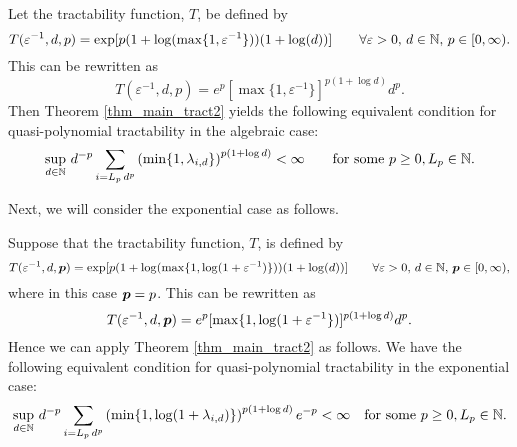 \documentclass[sort&compress]{elsarticle}
\newcommand{\peter}[1]{\begingroup\color{purple}#1\endgroup}
\begin{document}
\begin{example} 


Let the tractability function, $T$,
be defined by
\[
 T(\varepsilon^{-1},d,p)= \exp[ p(1+\log(\max\{1,\varepsilon^{-1}\}))(1+\log (d))]  \qquad \forall \varepsilon > 0, \,  d \in \mathbb{N}, \, p \in [0,\infty).
\]
This can be rewritten as 
\[
T(\varepsilon^{-1},d,p) = e^p[\max\{1,\varepsilon^{-1}\}]^{p(1+\log d)}d^p.
\]
Then Theorem \ref{thm_main_tract2} yields the following equivalent condition for quasi-polynomial tractability in the algebraic case:
\[
\sup_{d\in\mathbb{N}}\,d^{-p}\sum_{i=L_p\,d^{p}} \left(\min\{1,\lambda_{i,d}\} \right)^{p(1+\log d)} < \infty \qquad \text{for some } p \geq 0, L_p \in \mathbb{N}.\]
\end{example}
Next, we will consider the exponential case as follows.
\begin{example}

\noindent Suppose that the tractability function, $T$, is defined by
\[
 T(\varepsilon^{-1},d,\boldsymbol{p})= \exp [p(1+\log(\max\{1,\log(1+\varepsilon^{-1})\}))(1+\log (d))]  \qquad \forall \varepsilon > 0, \,  d \in \mathbb{N}, \, \boldsymbol{p} \in [0,\infty),
\] where in this case $\boldsymbol{p} = p$. This can be rewritten as 
\[
T(\varepsilon^{-1},d,\boldsymbol{p}) = e^p[\max\{1,\log(1+\varepsilon^{-1}\})]^{p(1+\log d)}d^p.
\]
Hence we can apply Theorem \ref{thm_main_tract2} as follows. We have the following equivalent condition for quasi-polynomial tractability in the exponential case:
\[
\sup_{d\in\mathbb{N}}\,d^{-p}\sum_{i=L_p\,d^{p}} \left(\min\{1,\log(1+\lambda_{i,d})\} \right)^{p(1+\log d)}e^{-p} < \infty \quad \text{for some } p \geq 0, L_p \in \mathbb{N}.
\]
\end{example}
\end{document}
